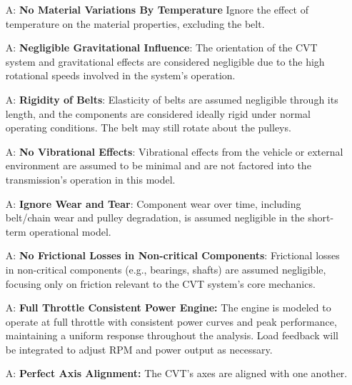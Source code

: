 \documentclass[12pt]{article}
\newcounter{assumpnum} %
\begin{document}
\begin{itemize}

\item[A\refstepcounter{assumpnum}\theassumpnum \label{A_1}:]
\textbf{No Material Variations By Temperature } Ignore the effect of temperature on the material properties, excluding the belt.

\item[A\refstepcounter{assumpnum}\theassumpnum \label{A_2}:]
\textbf{Negligible Gravitational Influence}: The orientation of the CVT system and gravitational effects are considered negligible due to the high rotational speeds involved in the system's operation.

\item[A\refstepcounter{assumpnum}\theassumpnum \label{A_3}:]
\textbf{Rigidity of Belts}: Elasticity of belts are assumed negligible through its length, and the components are considered ideally rigid under normal operating conditions. The belt may still rotate about the pulleys.

\item[A\refstepcounter{assumpnum}\theassumpnum \label{A_4}:]
\textbf{No Vibrational Effects}: Vibrational effects from the vehicle or external environment are assumed to be minimal and are not factored into the transmission’s operation in this model.

\item[A\refstepcounter{assumpnum}\theassumpnum \label{A_5}:]
\textbf{Ignore Wear and Tear}: Component wear over time, including belt/chain wear and pulley degradation, is assumed negligible in the short-term operational model.

\item[A\refstepcounter{assumpnum}\theassumpnum \label{A_6}:]
\textbf{No Frictional Losses in Non-critical Components}: Frictional losses in non-critical components (e.g., bearings, shafts) are assumed negligible, focusing only on friction relevant to the CVT system's core mechanics.

\item[A\refstepcounter{assumpnum}\theassumpnum \label{A_7}:]
\textbf{Full Throttle Consistent Power Engine:} The engine is modeled to operate at full throttle with consistent power curves and peak performance, maintaining a uniform response throughout the analysis. Load feedback will be integrated to adjust RPM and power output as necessary.

\item[A\refstepcounter{assumpnum}\theassumpnum \label{A_8}:]
\textbf{Perfect Axis Alignment:} The CVT's axes are aligned with one another.


\end{itemize}
\end{document}
